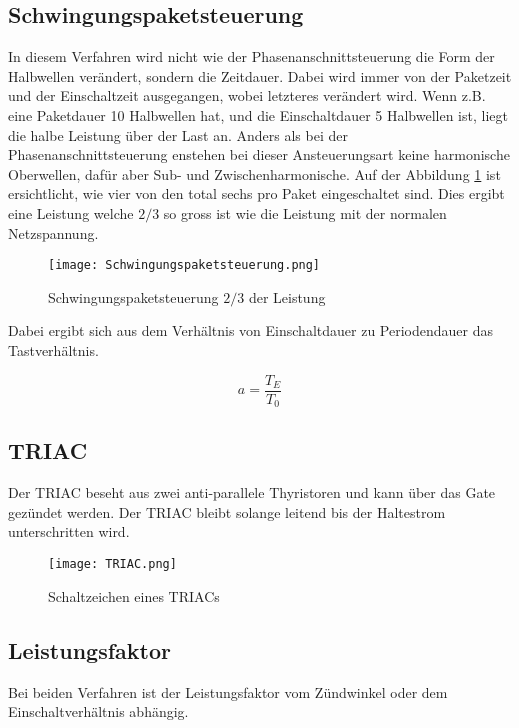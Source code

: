 \subsection{Schwingungspaketsteuerung}
In diesem Verfahren wird nicht wie der Phasenanschnittsteuerung die Form der Halbwellen verändert, sondern die Zeitdauer. Dabei wird immer von der Paketzeit und der Einschaltzeit ausgegangen, wobei letzteres verändert wird. Wenn z.B. eine Paketdauer 10 Halbwellen hat, und die Einschaltdauer 5 Halbwellen ist, liegt die halbe Leistung über der Last an. Anders als bei der Phasenanschnittsteuerung enstehen bei dieser Ansteuerungsart keine harmonische Oberwellen, dafür aber Sub- und Zwischenharmonische. Auf der Abbildung \ref{fig:Schwingungspaketsteuerung} ist ersichtlicht, wie vier von den total sechs pro Paket eingeschaltet sind. Dies ergibt eine Leistung welche ${2}/{3}$ so gross ist wie die Leistung mit der normalen Netzspannung.

\begin{figure}[ht!]
	\centering
	\texttt{[image: Schwingungspaketsteuerung.png]}	
	\caption{Schwingungspaketsteuerung ${2}/{3}$ der Leistung \cite{Schwingungspaketsteuerung}}\label{fig:Schwingungspaketsteuerung}
\end{figure}

Dabei ergibt sich aus dem Verhältnis von Einschaltdauer zu Periodendauer das Tastverhältnis.

\begin{equation}\label{eq:Einschaltverhältnis}
a = \frac{T_E}{T_0}
\end{equation}

\subsection{TRIAC}
Der TRIAC beseht aus zwei anti-parallele Thyristoren und kann über das Gate gezündet werden. Der TRIAC bleibt solange leitend bis der Haltestrom unterschritten wird. 

\begin{figure}[ht!]
	\centering
	\texttt{[image: TRIAC.png]}	
	\caption{Schaltzeichen eines TRIACs \cite{TRIAC}}\label{fig:TRIAC}
\end{figure}




\subsection{Leistungsfaktor}
Bei beiden Verfahren ist der Leistungsfaktor vom Zündwinkel oder dem Einschaltverhältnis abhängig. 

